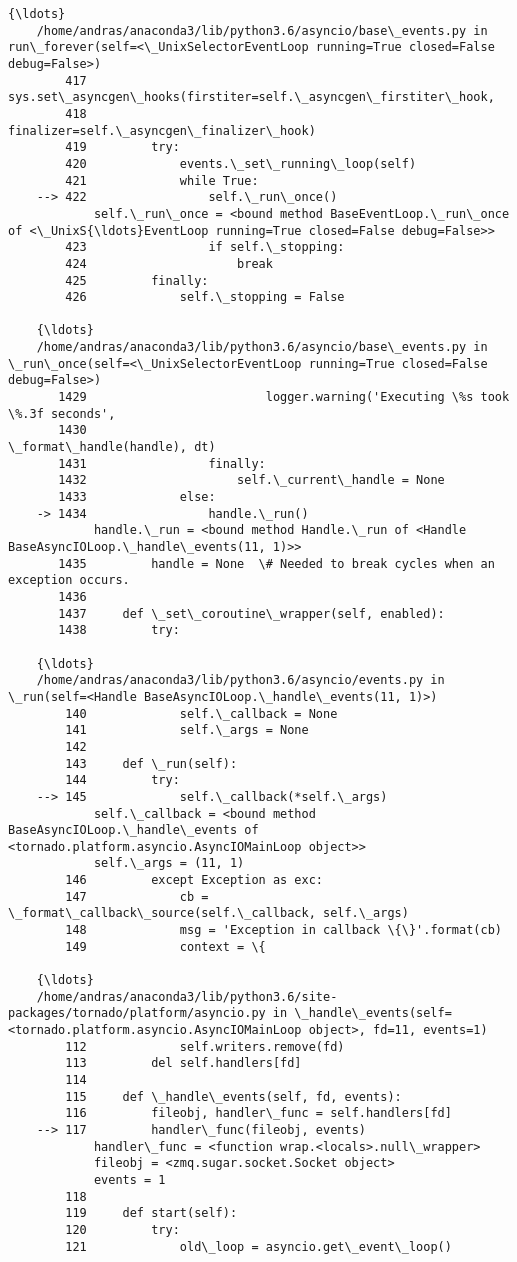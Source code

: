 \documentclass[11pt]{article}
\begin{document}
\begin{Verbatim}[commandchars=\\\{\}]
    {\ldots}
    /home/andras/anaconda3/lib/python3.6/asyncio/base\_events.py in run\_forever(self=<\_UnixSelectorEventLoop running=True closed=False debug=False>)
        417             sys.set\_asyncgen\_hooks(firstiter=self.\_asyncgen\_firstiter\_hook,
        418                                    finalizer=self.\_asyncgen\_finalizer\_hook)
        419         try:
        420             events.\_set\_running\_loop(self)
        421             while True:
    --> 422                 self.\_run\_once()
            self.\_run\_once = <bound method BaseEventLoop.\_run\_once of <\_UnixS{\ldots}EventLoop running=True closed=False debug=False>>
        423                 if self.\_stopping:
        424                     break
        425         finally:
        426             self.\_stopping = False
    
    {\ldots}
    /home/andras/anaconda3/lib/python3.6/asyncio/base\_events.py in \_run\_once(self=<\_UnixSelectorEventLoop running=True closed=False debug=False>)
       1429                         logger.warning('Executing \%s took \%.3f seconds',
       1430                                        \_format\_handle(handle), dt)
       1431                 finally:
       1432                     self.\_current\_handle = None
       1433             else:
    -> 1434                 handle.\_run()
            handle.\_run = <bound method Handle.\_run of <Handle BaseAsyncIOLoop.\_handle\_events(11, 1)>>
       1435         handle = None  \# Needed to break cycles when an exception occurs.
       1436 
       1437     def \_set\_coroutine\_wrapper(self, enabled):
       1438         try:
    
    {\ldots}
    /home/andras/anaconda3/lib/python3.6/asyncio/events.py in \_run(self=<Handle BaseAsyncIOLoop.\_handle\_events(11, 1)>)
        140             self.\_callback = None
        141             self.\_args = None
        142 
        143     def \_run(self):
        144         try:
    --> 145             self.\_callback(*self.\_args)
            self.\_callback = <bound method BaseAsyncIOLoop.\_handle\_events of <tornado.platform.asyncio.AsyncIOMainLoop object>>
            self.\_args = (11, 1)
        146         except Exception as exc:
        147             cb = \_format\_callback\_source(self.\_callback, self.\_args)
        148             msg = 'Exception in callback \{\}'.format(cb)
        149             context = \{
    
    {\ldots}
    /home/andras/anaconda3/lib/python3.6/site-packages/tornado/platform/asyncio.py in \_handle\_events(self=<tornado.platform.asyncio.AsyncIOMainLoop object>, fd=11, events=1)
        112             self.writers.remove(fd)
        113         del self.handlers[fd]
        114 
        115     def \_handle\_events(self, fd, events):
        116         fileobj, handler\_func = self.handlers[fd]
    --> 117         handler\_func(fileobj, events)
            handler\_func = <function wrap.<locals>.null\_wrapper>
            fileobj = <zmq.sugar.socket.Socket object>
            events = 1
        118 
        119     def start(self):
        120         try:
        121             old\_loop = asyncio.get\_event\_loop()
    

\end{Verbatim}
\end{document}
